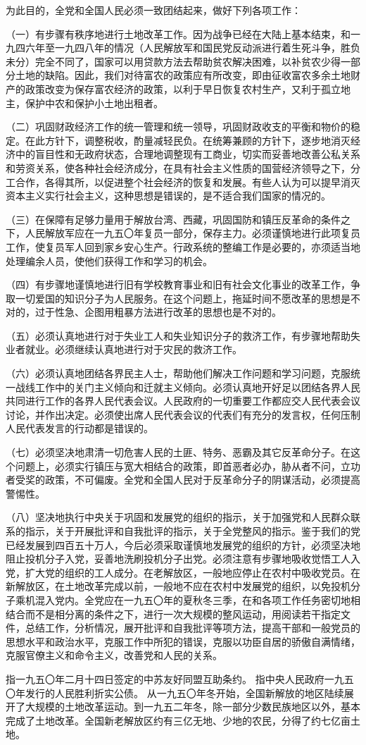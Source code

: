 为此目的，全党和全国人民必须一致团结起来，做好下列各项工作：

（一）有步骤有秩序地进行土地改革工作。因为战争已经在大陆上基本结束，和一九四六年至一九四八年的情况（人民解放军和国民党反动派进行着生死斗争，胜负未分）完全不同了，国家可以用贷款方法去帮助贫农解决困难，以补贫农少得一部分土地的缺陷。因此，我们对待富农的政策应有所改变，即由征收富农多余土地财产的政策改变为保存富农经济的政策，以利于早日恢复农村生产，又利于孤立地主，保护中农和保护小土地出租者。

（二）巩固财政经济工作的统一管理和统一领导，巩固财政收支的平衡和物价的稳定。在此方针下，调整税收，酌量减轻民负。在统筹兼顾的方针下，逐步地消灭经济中的盲目性和无政府状态，合理地调整现有工商业，切实而妥善地改善公私关系和劳资关系，使各种社会经济成分，在具有社会主义性质的国营经济领导之下，分工合作，各得其所，以促进整个社会经济的恢复和发展。有些人认为可以提早消灭资本主义实行社会主义，这种思想是错误的，是不适合我们国家的情况的。

（三）在保障有足够力量用于解放台湾、西藏，巩固国防和镇压反革命的条件之下，人民解放军应在一九五〇年复员一部分，保存主力。必须谨慎地进行此项复员工作，使复员军人回到家乡安心生产。行政系统的整编工作是必要的，亦须适当地处理编余人员，使他们获得工作和学习的机会。

（四）有步骤地谨慎地进行旧有学校教育事业和旧有社会文化事业的改革工作，争取一切爱国的知识分子为人民服务。在这个问题上，拖延时间不愿改革的思想是不对的，过于性急、企图用粗暴方法进行改革的思想也是不对的。

（五）必须认真地进行对于失业工人和失业知识分子的救济工作，有步骤地帮助失业者就业。必须继续认真地进行对于灾民的救济工作。

（六）必须认真地团结各界民主人士，帮助他们解决工作问题和学习问题，克服统一战线工作中的关门主义倾向和迁就主义倾向。必须认真地开好足以团结各界人民共同进行工作的各界人民代表会议。人民政府的一切重要工作都应交人民代表会议讨论，并作出决定。必须使出席人民代表会议的代表们有充分的发言权，任何压制人民代表发言的行动都是错误的。

（七）必须坚决地肃清一切危害人民的土匪、特务、恶霸及其它反革命分子。在这个问题上，必须实行镇压与宽大相结合的政策，即首恶者必办，胁从者不问，立功者受奖的政策，不可偏废。全党和全国人民对于反革命分子的阴谋活动，必须提高警惕性。

（八）坚决地执行中央关于巩固和发展党的组织的指示，关于加强党和人民群众联系的指示，关于开展批评和自我批评的指示，关于全党整风的指示。鉴于我们的党已经发展到四百五十万人，今后必须采取谨慎地发展党的组织的方针，必须坚决地阻止投机分子入党，妥善地洗刷投机分子出党。必须注意有步骤地吸收觉悟工人入党，扩大党的组织的工人成分。在老解放区，一般地应停止在农村中吸收党员。在新解放区，在土地改革完成以前，一般地不应在农村中发展党的组织，以免投机分子乘机混入党内。全党应在一九五〇年的夏秋冬三季，在和各项工作任务密切地相结合而不是相分离的条件之下，进行一次大规模的整风运动，用阅读若干指定文件，总结工作，分析情况，展开批评和自我批评等项方法，提高干部和一般党员的思想水平和政治水平，克服工作中所犯的错误，克服以功臣自居的骄傲自满情绪，克服官僚主义和命令主义，改善党和人民的关系。


\begin{maonote}
指一九五〇年二月十四日签定的中苏友好同盟互助条约。
指中央人民政府一九五〇年发行的人民胜利折实公债。
从一九五〇年冬开始，全国新解放的地区陆续展开了大规模的土地改革运动。到一九五二年冬，除一部分少数民族地区以外，基本完成了土地改革。全国新老解放区约有三亿无地、少地的农民，分得了约七亿亩土地。
\end{maonote}
